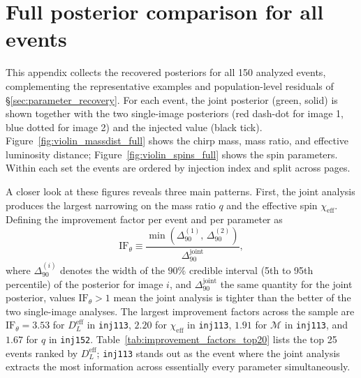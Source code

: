 \renewcommand{\thechapter}{D}
\chapter{Full posterior comparison for all events}
\label{app:violins}

This appendix collects the recovered posteriors for all 150 analyzed events, complementing the representative examples and population-level residuals of \S\ref{sec:parameter_recovery}. For each event, the joint posterior (green, solid) is shown together with the two single-image posteriors (red dash-dot for image 1, blue dotted for image 2) and the injected value (black tick). Figure~\ref{fig:violin_massdist_full} shows the chirp mass, mass ratio, and effective luminosity distance; Figure~\ref{fig:violin_spins_full} shows the spin parameters. Within each set the events are ordered by injection index and split across pages.

A closer look at these figures reveals three main patterns. First, the joint analysis produces the largest narrowing on the mass ratio $q$ and the effective spin $\chi_\mathrm{eff}$. Defining the improvement factor per
event and per parameter as
\begin{equation}
\mathrm{IF}_\theta \equiv \frac{\min\!\left(\Delta_{90}^{(1)},\,\Delta_{90}^{(2)}\right)}{\Delta_{90}^{\mathrm{joint}}},
\label{eq:improvement_factor}
\end{equation}
where $\Delta_{90}^{(i)}$ denotes the width of the $90\%$ credible interval (5th to 95th percentile) of the posterior for image $i$, and $\Delta_{90}^{\mathrm{joint}}$ the same quantity for the joint posterior, values $\mathrm{IF}_\theta>1$ mean the joint analysis is tighter than the better of the two single-image analyses. The largest improvement factors across the sample are $\mathrm{IF}_\theta=3.53$ for $D_L^{\mathrm{eff}}$ in \texttt{inj113}, $2.20$ for $\chi_\mathrm{eff}$ in \texttt{inj113}, $1.91$ for $\mathcal{M}$ in \texttt{inj113}, and $1.67$ for $q$ in \texttt{inj152}. Table~\ref{tab:improvement_factors_top20} lists the top 25 events ranked by $D_L^{\mathrm{eff}}$; \texttt{inj113} stands out as the event where the joint analysis extracts the most information across essentially every parameter simultaneously.

